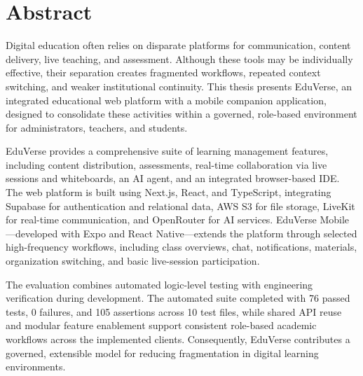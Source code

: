 \chapter*{Abstract}

Digital education often relies on disparate platforms for communication,
content delivery, live teaching, and assessment. Although these tools may be
individually effective, their separation creates fragmented workflows,
repeated context switching, and weaker institutional continuity. This thesis
presents EduVerse, an integrated educational web platform with a mobile
companion application, designed to consolidate these activities within a
governed, role-based environment for administrators, teachers, and students.

EduVerse provides a comprehensive suite of learning management features,
including content distribution, assessments, real-time collaboration via live
sessions and whiteboards, an AI agent, and an integrated browser-based IDE.
The web platform is built using Next.js, React, and TypeScript, integrating
Supabase for authentication and relational data, AWS S3 for file storage,
LiveKit for real-time communication, and OpenRouter for AI services.
EduVerse Mobile---developed with Expo and React Native---extends the platform
through selected high-frequency workflows, including class overviews, chat,
notifications, materials, organization switching, and basic live-session
participation.

The evaluation combines automated logic-level testing with engineering
verification during development. The automated suite completed with 76 passed
tests, 0 failures, and 105 assertions across 10 test files, while shared API
reuse and modular feature enablement support consistent role-based academic
workflows across the implemented clients. Consequently, EduVerse contributes a
governed, extensible model for reducing fragmentation in digital learning
environments.

